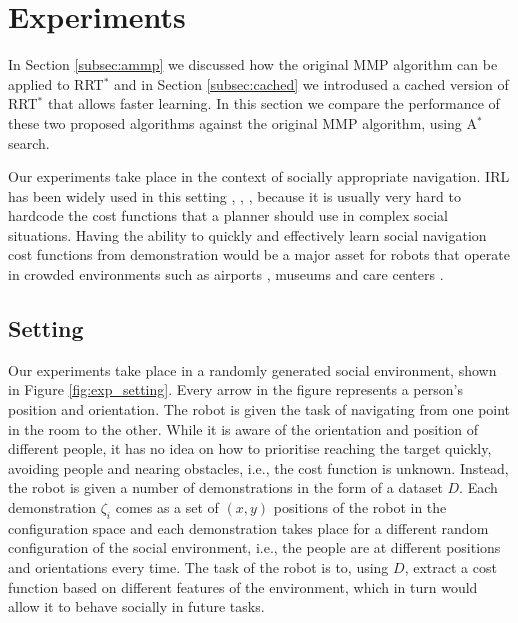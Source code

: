 \documentclass{article}  %
\begin{document}





\section{Experiments}
	In Section \ref{subsec:ammp} we discussed how the original MMP algorithm can be applied to RRT$^*$ and in Section \ref{subsec:cached} we introdused a cached version of RRT$^*$ that allows faster learning. In this section we compare the performance of these two proposed algorithms against the original MMP algorithm, using A$^*$ search.
	
	Our experiments take place in the context of socially appropriate navigation. IRL has been widely used in this setting \cite{okallearning}, \cite{henry2010learning}, \cite{vasquez2014inverse}, because it is usually very hard to hardcode the cost functions that a planner should use in complex social situations. Having the ability to quickly and effectively learn social navigation cost functions from demonstration would be a major asset for robots that operate in crowded environments such as airports \cite{triebel2015spencer}, museums \cite{thrun1999minerva} and care centers \cite{shiarlis2015teresa}.
	\subsection{Setting}
	Our experiments take place in a randomly generated social environment, shown in Figure \ref{fig:exp_setting}. Every arrow in the figure represents a person's position and orientation. The robot is given the task of navigating from one point in the room to the other. While it is aware of the orientation and position of different people, it has no idea on how to prioritise reaching the target quickly, avoiding people and nearing obstacles, i.e., the cost function is unknown. Instead, the robot is given a number of demonstrations in the form of a dataset $D$. Each demonstration $\zeta_i$ comes as a set of $(x,y)$ positions of the robot in the configuration space and each demonstration takes place for a different random configuration of the social environment, i.e., the people are at different positions and orientations every time. The task of the robot is to, using $D$, extract a cost function based on different features of the environment, which in turn would allow it to behave socially in future tasks.
\end{document}
